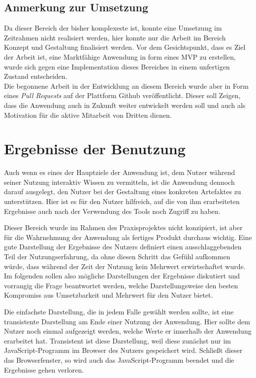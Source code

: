 \subsection{Anmerkung zur Umsetzung}
Da dieser Bereich der bisher komplexeste ist, konnte eine Umsetzung im Zeitrahmen nicht realisiert werden, hier konnte nur die Arbeit im Bereich Konzept und Gestaltung finalisiert werden.
 Vor dem Gesichtspunkt, dass es Ziel der Arbeit ist, eine Marktfähige Anwendung in form eines MVP zu erstellen, wurde sich gegen eine Implementation dieses Bereiches in einem unfertigen Zustand entscheiden.\\
Die begonnene Arbeit in der Entwicklung an diesem Bereich wurde aber in Form eines \textit{Pull Requests} auf der Plattform Github veröffentlicht. Dieser soll Zeigen, dass die Anwendung auch in Zukunft weiter entwickelt werden soll und auch als Motivation für die aktive Mitarbeit von Dritten dienen.

\section{Ergebnisse der Benutzung}
\label{chap:results}
Auch wenn es eines der Hauptziele der Anwendung ist, dem Nutzer während seiner Nutzung interaktiv Wissen zu vermitteln, ist die Anwendung dennoch darauf ausgelegt, den Nutzer bei der Gestaltung eines konkreten Artefaktes zu unterstützen. Hier ist es für den Nutzer hilfreich, auf die von ihm erarbeiteten Ergebnisse auch nach der Verwendung des Tools noch Zugriff zu haben.

Dieser Bereich wurde im Rahmen des Praxisprojektes nicht konzipiert, ist aber für die Wahrnehmung der Anwendung als fertiges Produkt durchaus wichtig. Eine gute Darstellung der Ergebnisse des Nutzers definiert einen ausschlaggebenden Teil der Nutzungserfahrung, da ohne diesen Schritt das Gefühl aufkommen würde, dass während der Zeit der Nutzung kein Mehrwert erwirtschaftet wurde.
Im folgenden sollen also mögliche Darstellungen der Ergebnisse diskutiert und vorrangig die Frage beantwortet werden, welche Darstellungsweise den besten Kompromiss aus Umsetzbarkeit und Mehrwert für den Nutzer bietet.

Die einfachste Darstellung, die in jedem Falle gewählt werden sollte, ist eine transistente Darstellung am Ende einer Nutzung der Anwendung. Hier sollte dem Nutzer noch einmal aufgezeigt werden, welche Werte er innerhalb der Anwendung erarbeitet hat. Transistent ist diese Darstellung, weil diese zunächst nur im JavaScript-Programm im Browser des Nutzers gespeichert wird. Schließt dieser das Browserfenster, so wird auch das JavaScript-Programm beendet und die Ergebnisse gehen verloren.

